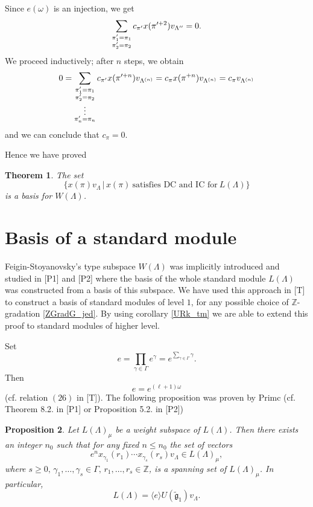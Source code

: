 \documentclass[a4paper, 10pt,oneside]{amsart}
\newtheorem{tm}{Theorem}
\newtheorem{prop}[tm]{Proposition}
\begin{document}
Since $e(\omega)$ is an injection, we get
$$\sum_{\begin{subarray}{c} \pi_1'=\pi_1 \\ \pi_2'=\pi_2\end{subarray}}c_{\pi'}x(\pi'^{+2})
v_{\Lambda''}=0.$$ We proceed inductively; after $n$ steps, we obtain
$$0=\sum_{\begin{subarray}{c} \pi_1'=\pi_1 \\ \pi_2'=\pi_2 \\ \vdots \\  \pi_n'=\pi_n \end{subarray}}c_{\pi'}x(\pi'^{+n}) v_{\Lambda^{(n)}}
=c_\pi x(\pi^{+n}) v_{\Lambda^{(n)}}=c_\pi v_{\Lambda^{(n)}}$$
and we can conclude that $c_\pi=0$.

Hence we have proved
\begin{tm}\label{FSbaza_tm}
The set
$$\{x(\pi)v_\Lambda \,|\, x(\pi) \ \textrm{satisfies DC and IC for}\ L(\Lambda)\}$$
is a basis for $W(\Lambda)$.
\end{tm}

\section{Basis of a standard module}

Feigin-Stoyanovsky's type subspace $W(\Lambda)$ was implicitly introduced and studied in  [P1] and [P2] where the basis of the
whole standard module $L(\Lambda)$ was constructed from a basis of this subspace. We have used this approach in [T] to construct
a basis of standard modules of level $1$, for any possible choice of ${{\mathbb Z}}$-gradation \eqref{ZGradG_jed}. By using corollary \ref{URk_tm}
we are able to extend this proof to standard modules of higher level.

Set
$$e=\prod_{\gamma\in\Gamma}e^\gamma=e^{\sum_{\gamma\in\Gamma}\gamma}.$$
Then
$$e=e^{(\ell+1)\omega}$$
(cf. relation $(26)$ in [T]). The following proposition was proven by Primc (cf.
Theorem 8.2. in [P1] or Proposition 5.2. in [P2])

\begin{prop} \label{StModGenSkup_prop} Let $L(\Lambda)_\mu$ be a weight subspace of
$L(\Lambda)$. Then there exists an integer $n_0$ such that for any
fixed $n\leq n_0$ the set of vectors
$$e^n x_{\gamma_1}(r_1)\cdots x_{\gamma_s}(r_s)v_\Lambda \in L(\Lambda)_\mu,$$
where  $s\geq
0,\,\gamma_1,\dots,\gamma_s\in\Gamma,\,r_1,\dots,r_s\in{{\mathbb Z}}$, is a
spanning set of $L(\Lambda)_\mu$. In particular,
$$L(\Lambda)=\langle e \rangle U({\tilde{{\mathfrak g}}}_1)v_\Lambda.$$
\end{prop}
\end{document}
